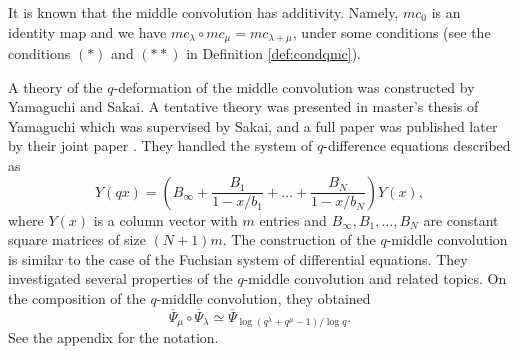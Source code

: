 \documentclass[pdftex]{sigma}
\numberwithin{equation}{section}
\theoremstyle{definition}
\begin{document}
It is known that the middle convolution has additivity.
Namely, $mc_{0 } $ is an identity map and we have
$
mc_{\lambda} \circ mc_{\mu} = mc_{\lambda + \mu} $,
under some conditions (see the conditions $(*)$ and $(**)$ in Definition \ref{def:condqmc}).

A theory of the $q$-deformation of the middle convolution was constructed by Yamaguchi and Sakai.
A tentative theory was presented in master's thesis of Yamaguchi \cite{Yg} which was supervised by Sakai, and a full paper was published later by their joint paper \cite{SY}.
They handled the system of $q$-difference equations described as
\begin{equation}
 Y(qx) = \left( B_{\infty} + \frac{B_1}{1 - x/ b_1} +\dots + \frac{B_N}{1 - x/b_N } \right) Y(x),
\label{eq:YqxSY0}
\end{equation}
where $Y(x)$ is a column vector with $m$ entries and $B_{\infty} , B_1, \dots ,B_N$ are constant square matrices of size $(N+1)m $.
The construction of the $q$-middle convolution is similar to the case of the Fuchsian system of differential equations.
They investigated several properties of the $q$-middle convolution and related topics.
On the composition of the $q$-middle convolution, they obtained
\begin{equation}
\overline{\Psi }_{\mu } \circ \overline{\Psi }_{\lambda } \simeq \overline{\Psi }_{\log ( q^{\lambda } + q^{\mu } -1)/ \log q }.  \label{eq:Psimulam0}
\end{equation}
See the appendix for the notation.
\end{document}

